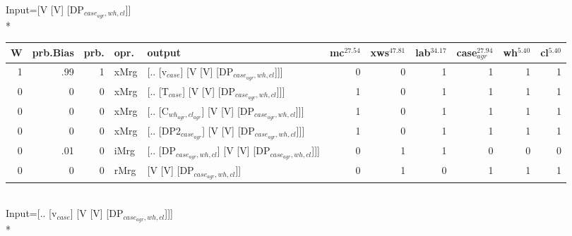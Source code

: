 \begingroup\scriptsize Input=[V [V] [DP$_{case_{agr},wh,cl}$]]\\*
\begin{tabularx}{\linewidth}{rrrlXrrrrrr}
\hline
   W &   prb.Bias &   prb. & opr.   & output                                               &   mc$^{27.54}$ &   xws$^{47.81}$ &   lab$^{34.17}$ &   case$_{agr}^{27.94}$ &   wh$^{5.40}$ &   cl$^{5.40}$ \\
\hline
   1 &       .99 &   1 & xMrg & [.. [v$_{case}$] [V [V] [DP$_{case_{agr},wh,cl}$]]]            &            0 &             0 &             1 &                  1 &           1 &           1 \\
   0 &       0 &   0 & xMrg & [.. [T$_{case}$] [V [V] [DP$_{case_{agr},wh,cl}$]]]            &            1 &             0 &             1 &                  1 &           1 &           1 \\
   0 &       0 &   0 & xMrg & [.. [C$_{wh_{agr},cl_{agr}}$] [V [V] [DP$_{case_{agr},wh,cl}$]]]   &            1 &             0 &             1 &                  1 &           1 &           1 \\
   0 &       0 &   0 & xMrg & [.. [DP2$_{case_{agr}}$] [V [V] [DP$_{case_{agr},wh,cl}$]]]      &            1 &             0 &             1 &                  1 &           1 &           1 \\
   0 &       .01 &   0 & iMrg & [.. [DP$_{case_{agr},wh,cl}$] [V [V] [DP$_{case_{agr},wh,cl}$]]] &            0 &             1 &             1 &                  0 &           0 &           0 \\
   0 &       0 &   0 & rMrg & [V [V] [DP$_{case_{agr},wh,cl}$]]                          &            0 &             1 &             0 &                  1 &           1 &           1 \\
\hline
\end{tabularx}\endgroup\\
\begingroup\scriptsize Input=[.. [v$_{case}$] [V [V] [DP$_{case_{agr},wh,cl}$]]]\\*
